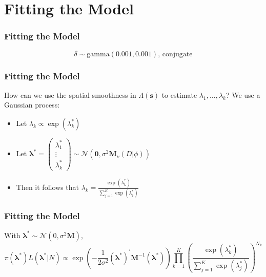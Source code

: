 \documentclass[10pt, compress]{beamer}
\begin{document}
  \section{Fitting the Model}
  \begin{frame}
    \frametitle{Fitting the Model}
      $$\delta \sim \text{gamma}(0.001, 0.001)\text{,  conjugate}$$
  \end{frame}
  \begin{frame}
    \frametitle{Fitting the Model}
    How can we use the spatial smoothness in $\Lambda(\mathbf{s})$ to estimate $\lambda_1, \dots, \lambda_k$?
    \pause
    \newline
    \newline
    We use a Gaussian process:
    \begin{itemize}
      \item Let $\lambda_k \propto \exp(\lambda_k^{*})$
      \item Let $\boldsymbol{\lambda}^{*} = \begin{pmatrix} \lambda_1^{*} \\ \vdots \\ \lambda_k^{*} \end{pmatrix} \sim \mathcal{N}(\mathbf{0}, \sigma^2\mathbf{M}_{\nu}(D|\phi))$
      \item Then it follows that $\lambda_k = \frac{\exp(\lambda_k^{*})}{\sum_{j=1}^{K}\exp(\lambda_j^{*})}$

    \end{itemize}
  \end{frame}
  \begin{frame}
    \frametitle{Fitting the Model}
      With $\boldsymbol\lambda^{*} \sim \mathcal{N}(0, \sigma^2\mathbf{M})$, 
    $$ \pi(\boldsymbol\lambda^{*})L(\boldsymbol\lambda^{*} | N) \propto 
      \exp\left(-\frac{1}{2\sigma^2}(\boldsymbol\lambda^{*})^{'}\mathbf{M}^{-1}(\boldsymbol\lambda^{*})\right)\prod_{k=1}^{K}\left(\frac{\exp(\lambda_k^{*})}{\sum_{j=1}^{K}\exp(\lambda_j^{*})}\right)^{N_k} $$
  \end{frame}
\end{document}
